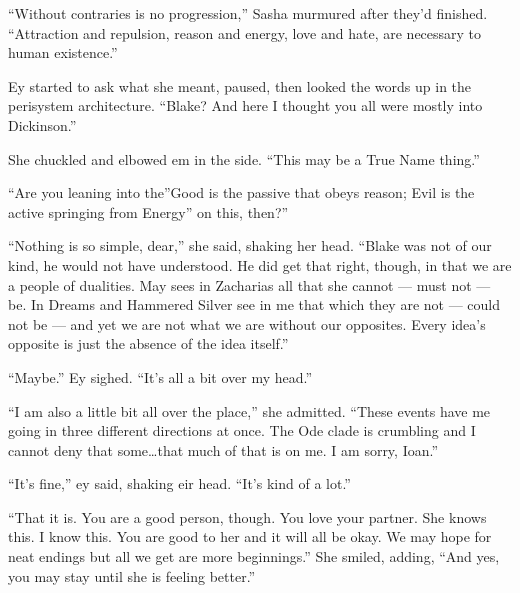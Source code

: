 ``Without contraries is no progression,'' Sasha murmured after they'd finished. ``Attraction and repulsion, reason and energy, love and hate, are necessary to human existence.''

Ey started to ask what she meant, paused, then looked the words up in the perisystem architecture. ``Blake? And here I thought you all were mostly into Dickinson.''

She chuckled and elbowed em in the side. ``This may be a True Name thing.''

``Are you leaning into the''Good is the passive that obeys reason; Evil is the active springing from Energy'' on this, then?''

``Nothing is so simple, dear,'' she said, shaking her head. ``Blake was not of our kind, he would not have understood. He did get that right, though, in that we are a people of dualities. May sees in Zacharias all that she cannot — must not — be. In Dreams and Hammered Silver see in me that which they are not — could not be — and yet we are not what we are without our opposites. Every idea's opposite is just the absence of the idea itself.''

``Maybe.'' Ey sighed. ``It's all a bit over my head.''

``I am also a little bit all over the place,'' she admitted. ``These events have me going in three different directions at once. The Ode clade is crumbling and I cannot deny that some\ldots that much of that is on me. I am sorry, Ioan.''

``It's fine,'' ey said, shaking eir head. ``It's kind of a lot.''

``That it is. You are a good person, though. You love your partner. She knows this. I know this. You are good to her and it will all be okay. We may hope for neat endings but all we get are more beginnings.'' She smiled, adding, ``And yes, you may stay until she is feeling better.''
